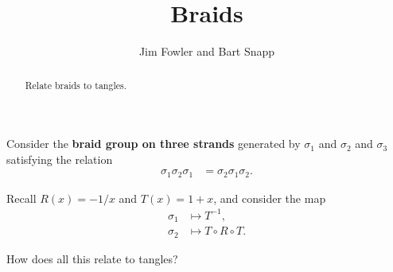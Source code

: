 \documentclass{ximera}
\title{Braids}
\author{Jim Fowler and Bart Snapp}
\begin{document}
\begin{abstract}
  Relate braids to tangles.
\end{abstract}

\maketitle

Consider the \textbf{braid group on three strands} generated by $\sigma_1$ and $\sigma_2$ and $\sigma_3$ satisfying the relation
\begin{align*}
  \sigma_1 \sigma_2 \sigma_1 &= \sigma_2 \sigma_1 \sigma_2.
\end{align*}

Recall $R(x) = -1/x$ and $T(x) = 1+x$, and consider the map
\begin{align*}
  \sigma_1 &\mapsto T^{-1}, \\
  \sigma_2 &\mapsto T \circ R \circ T.
\end{align*}

\begin{question}
  How does all this relate to tangles?

  \begin{freeResponse}
  \end{freeResponse}
\end{question}
\end{document}
